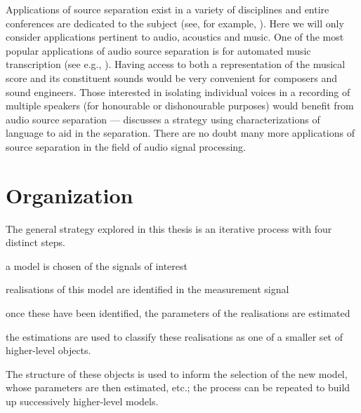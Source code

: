 Applications of source separation exist in a variety of disciplines and entire
conferences are dedicated to the subject (see, for example,
\cite{zarzoso2010latent}).  Here we will only consider applications pertinent to
audio, acoustics and music. One of the most popular applications of audio source
separation is for automated music transcription (see e.g.,
\cite{bertin2010enforcing}). Having access to both a representation of the
musical score and its constituent sounds would be very convenient for composers
and sound engineers. Those interested in isolating individual voices in a
recording of multiple speakers (for honourable or dishonourable purposes) would
benefit from audio source separation --- \cite{mysore2012non} discusses a
strategy using characterizations of language to aid in the separation. There are
no doubt many more applications of source separation in the field of audio
signal processing.

\section{Organization}

The general strategy explored in this thesis is an iterative process with four
distinct steps.
\begin{enumerate*}[label=(\arabic*),itemjoin={{. }}]
\item a model is chosen of the signals of interest
\item realisations of this model are
identified in the measurement signal
\item once these have been identified, the parameters
of the realisations are estimated
\item the estimations are used to classify these
realisations as one of a smaller set of higher-level objects.
\end{enumerate*}
The structure of these objects is used to inform the selection of the new model,
whose parameters are then estimated, etc.; the process can be repeated to build
up successively higher-level models.

